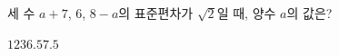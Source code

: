 세 수 $a+7$, $6$, $8-a$의 표준편차가 $\sqrt{2}$일 때, 양수 $a$의 값은?
\begin{choices32}{$1$}{$2$}{$3$}{$6.5$}{$7.5$}\end{choices32}
